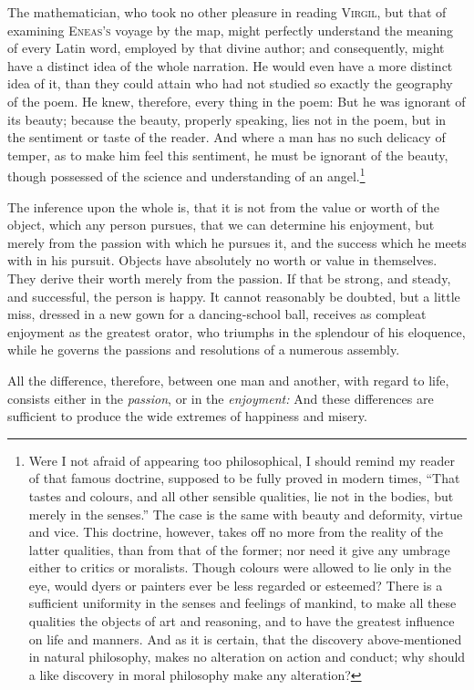 The mathematician, who took no other pleasure in reading
\textsc{Virgil}, but that of examining \textsc{Eneas's} voyage by the
map, might perfectly understand the meaning of every Latin word,
employed by that divine author; and consequently, might have a
distinct idea of the whole narration. He would even have a more
distinct idea of it, than they could attain who had not studied so
exactly the geography of the poem. He knew, therefore, every thing in
the poem: But he was ignorant of its beauty; because the beauty,
properly speaking, lies not in the poem, but in the sentiment or taste
of the reader. And where a man has no such delicacy of temper, as to
make him feel this sentiment, he must be ignorant of the beauty,
though possessed of the science and understanding of an
angel.\footnote{Were I not afraid of appearing too philosophical, I
should remind my reader of that famous doctrine, supposed to be
fully proved in modern times, ``That tastes and colours, and all other
sensible qualities, lie not in the bodies, but merely in the senses.''
The case is the same with beauty and deformity, virtue and vice.
This doctrine, however, takes off no more from the reality of the
latter qualities, than from that of the former; nor need it give any
umbrage either to critics or moralists. Though colours were allowed to
lie only in the eye, would dyers or painters ever be less regarded
or esteemed? There is a sufficient uniformity in the senses and
feelings of mankind, to make all these qualities the objects of art
and reasoning, and to have the greatest influence on life and manners.
And as it is certain, that the discovery above-mentioned in natural
philosophy, makes no alteration on action and conduct; why should a
like discovery in moral philosophy make any alteration?}

The inference upon the whole is, that it is not from the value or
worth of the object, which any person pursues, that we can determine
his enjoyment, but merely from the passion with which he pursues it,
and the success which he meets with in his pursuit. Objects have
absolutely no worth or value in themselves. They derive their worth
merely from the passion. If that be strong, and steady, and
successful, the person is happy. It cannot reasonably be doubted, but
 a little miss, dressed in a new gown for a dancing-school
ball, receives as compleat enjoyment as the greatest orator, who
triumphs in the splendour of his eloquence, while he governs the
passions and resolutions of a numerous assembly.

All the difference, therefore, between one man and another, with
regard to life, consists either in the \textit{passion}, or in the
\textit{enjoyment:} And these differences are sufficient to produce
the wide extremes of happiness and misery.

